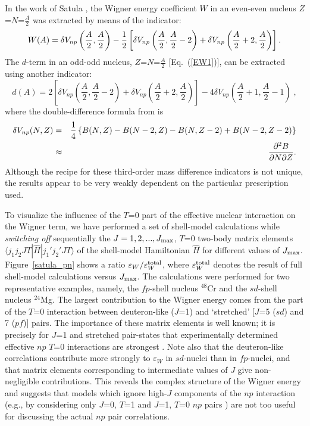 \documentclass[rmp,aps,floatfix]{revtex4}
\begin{document}
In the work of Satula \cite{Sat97},
the Wigner energy coefficient $W$ in an even-even nucleus
$Z$=$N$=$\frac{A}{2}$ was extracted by means of 
the indicator:
\begin{equation}\label{filtrw}
W(A) =   \delta V_{np}\left(\frac{A}{2},\frac{A}{2}\right)  -
{1\over 2} \left[ \delta V_{np}\left(\frac{A}{2},\frac{A}{2}-2
\right) +
\delta V_{np}\left(\frac{A}{2}+2,\frac{A}{2}\right) \right].
\end{equation}
The $d$-term  in
 an odd-odd  nucleus,
$Z$=$N$=$\frac{A}{2}$  [Eq.~(\ref{EW1})],
can be extracted using
another indicator:
\begin{equation}\label{filtrd}
d(A) =  
2\left[ \delta V_{np}\left(\frac{A}{2},\frac{A}{2}-2\right) +
\delta V_{np}\left(\frac{A}{2}+2,\frac{A}{2}\right) \right] -
4\delta V_{np}\left(\frac{A}{2}+1,\frac{A}{2}-1\right)\;,
\end{equation}
where the double-difference formula from \cite{Zha89} is
 \begin{eqnarray}\label{vnp}
 \delta V_{np} (N,Z) & = &
{1 \over 4} \left\{ B(N,Z) - B(N-2,Z) -B(N,Z-2)
 + B(N-2,Z-2)\right\}\nonumber \\
 & \approx & {\partial^2B\over{\partial N\partial Z}}.
 \end{eqnarray}
Although the recipe for
these third-order mass difference indicators
is not unique, the results appear to be very weakly dependent 
on the particular prescription used. 

To visualize the influence of
the $T$=0 part of the effective nuclear
interaction on the Wigner term,
we have performed a set of shell-model
calculations while {\em switching off}
 sequentially the $J=1,
2,..., J_{\rm max}$,
$T$=0 two-body matrix elements $\langle 
j_1j_2JT|\hat{H}|j_1'j_2'JT\rangle$
of the shell-model Hamiltonian $\hat{H}$
for different values of $J_{\rm max}$.
Figure~\ref{satula_pn} shows a  ratio
$\varepsilon_W/\varepsilon_W^{\rm total}$,
where $\varepsilon_W^{\rm total}$ denotes the 
result of full shell-model
calculations versus  $J_{\rm max}$. The calculations were
performed for 
two representative examples, namely, the $fp$-shell
nucleus $^{48}$Cr and the $sd$-shell nucleus $^{24}$Mg.
The  largest contribution to the Wigner energy comes from
the part of the $T$=0 interaction between 
deuteron-like ($J$=1) and
`stretched' [$J$=5 ($sd$) and 7 ($pf$)] pairs.
The importance of these matrix elements
is well known; it is precisely for  $J$=1 and 
stretched  pair-states
that experimentally determined effective 
$np$  $T$=0 
interactions are strongest \cite{Ana71,Sch71,Mol75}. 
Note also that
the deuteron-like correlations contribute more strongly
to $\varepsilon_W$
in $sd$-nuclei than in $fp$-nuclei, and that matrix
elements corresponding to  intermediate values of $J$
give non-negligible contributions.
This reveals the complex structure of the Wigner energy and
suggests that models which ignore high-$J$ components of
the $np$ interaction (e.g., by considering only
$J$=0, $T$=1 and $J$=1, $T$=0 $np$ pairs \cite{Eva81})
are not too useful for discussing the
actual  $np$ pair
correlations.
\end{document}
